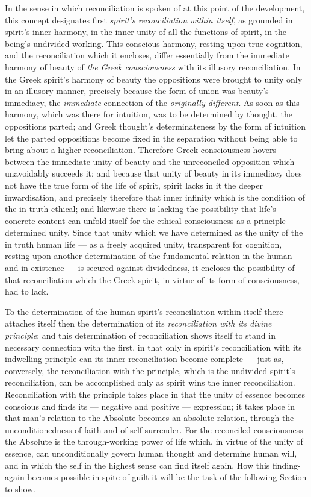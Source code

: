 \documentclass[12pt,a4paper]{book}
\begin{document}
In the sense in which reconciliation is spoken of at this point of the
development, this concept designates first \emph{spirit's reconciliation
within itself}, as grounded in spirit's inner harmony, in the inner unity of
all the functions of spirit, in the being's undivided working. This conscious
harmony, resting upon true cognition, and the reconciliation which it
encloses, differ essentially from the immediate harmony of beauty of \emph{the
Greek consciousness} with its illusory reconciliation. In the Greek spirit's
harmony of beauty the oppositions were brought to unity only in an illusory
manner, precisely because the form of union was beauty's immediacy, the
\emph{immediate} connection of the \emph{originally different}. As soon as
this harmony, which was there for intuition, was to be determined by thought,
the oppositions parted; and Greek thought's determinateness by the form of
intuition let the parted oppositions become fixed in the separation without
being able to bring about a higher reconciliation. Therefore Greek
consciousness hovers between the immediate unity of beauty and the
unreconciled opposition which unavoidably succeeds it; and because that unity
of beauty in its immediacy does not have the true form of the life of spirit,
spirit lacks in it the deeper inwardisation, and precisely therefore that
inner infinity which is the condition of the in truth ethical; and likewise
there is lacking the possibility that life's concrete content can unfold
itself for the ethical consciousness as a principle-determined unity. Since
that unity which we have determined as the unity of the in truth human life
--- as a freely acquired unity, transparent for cognition, resting upon
another determination of the fundamental relation in the human and in
existence --- is secured against dividedness, it encloses the possibility of
that reconciliation which the Greek spirit, in virtue of its form of
consciousness, had to lack.

To the determination of the human spirit's reconciliation within itself there
attaches itself then the determination of its \emph{reconciliation with its
divine principle}; and this determination of reconciliation shows itself to
stand in necessary connection with the first, in that only in spirit's
reconciliation with its indwelling principle can its inner reconciliation
become complete --- just as, conversely, the reconciliation with the
principle, which is the undivided spirit's reconciliation, can be accomplished
only as spirit wins the inner reconciliation. Reconciliation with the
principle takes place in that the unity of essence becomes conscious and finds
its --- negative and positive --- expression; it takes place in that man's relation
to the Absolute becomes an absolute relation, through the unconditionedness of
faith and of self-surrender. For the reconciled consciousness the Absolute is
the through-working power of life which, in virtue of the unity of essence,
can unconditionally govern human thought and determine human will, and in
which the self in the highest sense can find itself again. How this
finding-again becomes possible in spite of guilt it will be the task of the
following Section to show.
\end{document}
